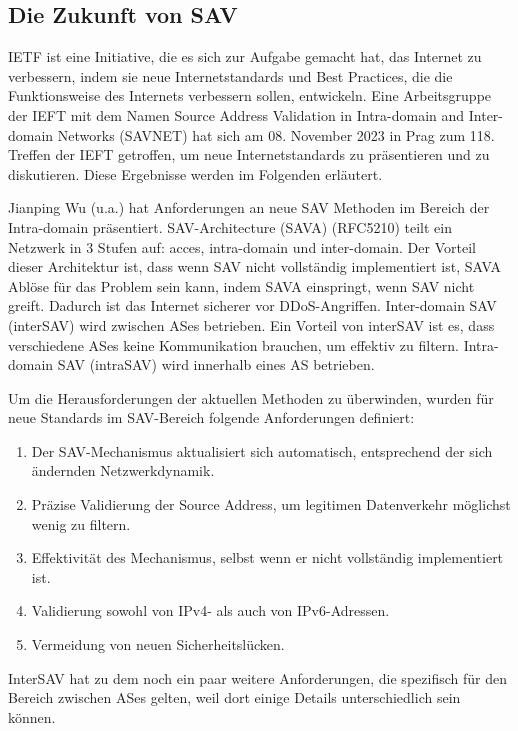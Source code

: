 \documentclass[sigplan,screen]{acmart}
\begin{document}
\subsection{Die Zukunft von SAV}

IETF ist eine Initiative, die es sich zur Aufgabe gemacht hat, das Internet zu verbessern, indem sie neue Internetstandards und Best Practices, die die Funktionsweise des Internets verbessern sollen, entwickeln.
Eine Arbeitsgruppe der IEFT mit dem Namen Source Address Validation in Intra-domain and Inter-domain Networks (SAVNET) hat sich am 08. November 2023 in Prag zum 118. Treffen der IEFT getroffen, um neue Internetstandards zu präsentieren und zu diskutieren. Diese Ergebnisse werden im Folgenden erläutert. 

Jianping Wu (u.a.) \cite{SAV_requirements01} hat Anforderungen an neue SAV Methoden im Bereich der Intra-domain präsentiert. SAV-Architecture (SAVA) (RFC5210) teilt ein Netzwerk in 3 Stufen auf: acces, intra-domain und inter-domain. Der Vorteil dieser Architektur ist, dass wenn SAV nicht vollständig implementiert ist, SAVA Ablöse für das Problem sein kann, indem SAVA einspringt, wenn SAV nicht greift. Dadurch ist das Internet sicherer vor DDoS-Angriffen. Inter-domain SAV (interSAV) wird zwischen ASes betrieben. Ein Vorteil von interSAV ist es, dass verschiedene ASes keine Kommunikation brauchen, um effektiv zu filtern. Intra-domain SAV (intraSAV) wird innerhalb eines AS betrieben.

Um die Herausforderungen der aktuellen Methoden zu überwinden, wurden für neue Standards im SAV-Bereich folgende Anforderungen definiert:

\begin{enumerate}
\item Der SAV-Mechanismus aktualisiert sich automatisch, entsprechend der sich ändernden Netzwerkdynamik.
\item Präzise Validierung der Source Address, um legitimen Datenverkehr möglichst wenig zu filtern.
\item Effektivität des Mechanismus, selbst wenn er nicht vollständig implementiert ist.
\item Validierung sowohl von IPv4- als auch von IPv6-Adressen.
\item Vermeidung von neuen Sicherheitslücken.
\end{enumerate}

InterSAV hat zu dem noch ein paar weitere Anforderungen, die spezifisch für den Bereich zwischen ASes gelten, weil dort einige Details unterschiedlich sein können.
\end{document}
